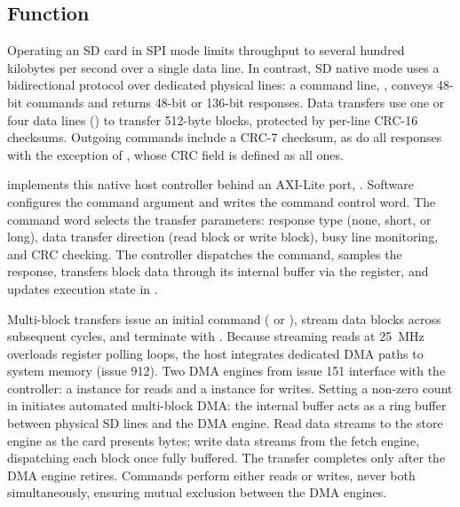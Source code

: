 
%
{}

\subsection*{Function}

Operating an SD card in SPI mode limits throughput to several hundred
kilobytes per second over a single data line. In contrast, SD native
mode uses a bidirectional protocol over dedicated physical lines: a command
line, , conveys 48-bit commands and returns 48-bit or 136-bit
responses. Data transfers use one or four data lines () to
transfer 512-byte blocks, protected by per-line CRC-16 checksums. Outgoing
commands include a CRC-7 checksum, as do all responses with the exception
of , whose CRC field is defined as all ones.

 implements this native host controller behind an AXI-Lite port,
. Software configures the command argument and writes the command
control word. The command word selects the transfer parameters: response
type (none, short, or long), data transfer direction (read block or write
block), busy line monitoring, and CRC checking. The controller dispatches
the command, samples the response, transfers block data through its internal
buffer via the  register, and updates execution state in .

Multi-block transfers issue an initial command ( or ),
stream data blocks across subsequent cycles, and terminate with .
Because streaming reads at 25~MHz overloads register polling loops, the host
integrates dedicated DMA paths to system memory (issue 912). Two DMA engines
from issue 151 interface with the controller: a  instance
for reads and a  instance for writes. Setting a non-zero count
in  initiates automated multi-block DMA: the internal buffer
acts as a ring buffer between physical SD lines and the DMA engine. Read data
streams to the store engine as the card presents bytes; write data streams
from the fetch engine, dispatching each block once fully buffered. The transfer
completes only after the DMA engine retires. Commands perform either reads or
writes, never both simultaneously, ensuring mutual exclusion between the DMA
engines.

